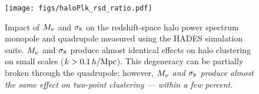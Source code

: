 \begin{figure}
\begin{center}
\texttt{[image: figs/haloPlk\_rsd\_ratio.pdf]}
    \caption{Impact of $M_\nu$ and $\sigma_8$ on the redshift-space halo power 
    spectrum monopole and quadrupole measured using the HADES simulation suite. 
    $M_\nu$ and $\sigma_8$ produce almost identical effects on halo clustering on 
    small scales ($k > 0.1\,h/\mathrm{Mpc}$). This degeneracy can be partially broken 
    through the quadrupole; however, {\em $M_\nu$ and $\sigma_8$ produce almost 
    the same effect on two-point clustering --- within a few percent}.
    }
\label{fig:plk}
\end{center}
\end{figure}


